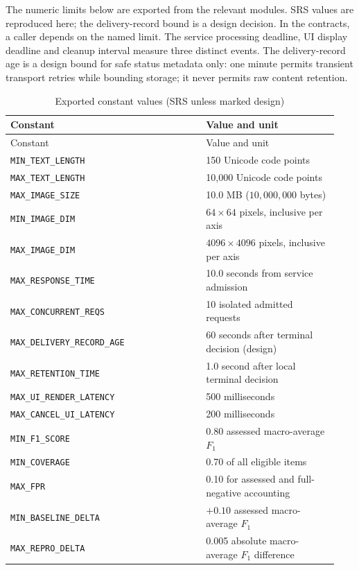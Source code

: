 \documentclass[12pt, titlepage]{article}
\newcommand{\Const}[1]{\texttt{#1}}
\begin{document}
\noindent The numeric limits below are exported from the relevant modules. SRS values are reproduced here; the delivery-record bound is a design decision. In the contracts, a caller depends on the named limit. The service processing deadline, UI display deadline and cleanup interval measure three distinct events. The delivery-record age is a design bound for safe status metadata only: one minute permits transient transport retries while bounding storage; it never permits raw content retention.

\begin{longtable}{@{}p{0.56\linewidth}p{0.38\linewidth}@{}}
\caption{Exported constant values (SRS unless marked design)}\label{TblConstants}\\
\toprule Constant & Value and unit \\ \midrule
\endfirsthead
\toprule Constant & Value and unit \\ \midrule
\endhead
\Const{MIN\_\allowbreak{}TEXT\_\allowbreak{}LENGTH} & 150 Unicode code points \\
\Const{MAX\_\allowbreak{}TEXT\_\allowbreak{}LENGTH} & 10,000 Unicode code points \\
\Const{MAX\_\allowbreak{}IMAGE\_\allowbreak{}SIZE} & 10.0 MB ($10{,}000{,}000$ bytes) \\
\Const{MIN\_\allowbreak{}IMAGE\_\allowbreak{}DIM} & $64\times64$ pixels, inclusive per axis \\
\Const{MAX\_\allowbreak{}IMAGE\_\allowbreak{}DIM} & $4096\times4096$ pixels, inclusive per axis \\
\Const{MAX\_\allowbreak{}RESPONSE\_\allowbreak{}TIME} & 10.0 seconds from service admission \\
\Const{MAX\_\allowbreak{}CONCURRENT\_\allowbreak{}REQS} & 10 isolated admitted requests \\
\Const{MAX\_\allowbreak{}DELIVERY\_\allowbreak{}RECORD\_\allowbreak{}AGE} & 60 seconds after terminal decision (design) \\
\Const{MAX\_\allowbreak{}RETENTION\_\allowbreak{}TIME} & 1.0 second after local terminal decision \\
\Const{MAX\_\allowbreak{}UI\_\allowbreak{}RENDER\_\allowbreak{}LATENCY} & 500 milliseconds \\
\Const{MAX\_\allowbreak{}CANCEL\_\allowbreak{}UI\_\allowbreak{}LATENCY} & 200 milliseconds \\
\Const{MIN\_\allowbreak{}F1\_\allowbreak{}SCORE} & 0.80 assessed macro-average $F_1$ \\
\Const{MIN\_\allowbreak{}COVERAGE} & 0.70 of all eligible items \\
\Const{MAX\_\allowbreak{}FPR} & 0.10 for assessed and full-negative accounting \\
\Const{MIN\_\allowbreak{}BASELINE\_\allowbreak{}DELTA} & $+0.10$ assessed macro-average $F_1$ \\
\Const{MAX\_\allowbreak{}REPRO\_\allowbreak{}DELTA} & 0.005 absolute macro-average $F_1$ difference \\
\bottomrule
\end{longtable}
\end{document}
